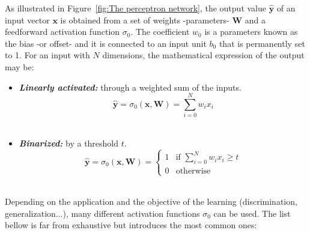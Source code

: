 \documentclass[a4paper,11pt]{report}
\newcommand{\Important}[1]{\textbf{{\em #1}}}
\begin{document}
		As illustrated in Figure~\ref{fig:The perceptron network}, the output value $\mathbf{\hat{y}}$ of an input vector $\mathbf{x}$ is obtained from a set of weights -parameters- $\mathbf{W}$ and a feedforward activation function $\sigma_{0}$. The coefficient $w_{0}$ is a parameters known as the bias -or offset- and it is connected to an input unit $b_{0}$ that is permanently set to 1. For an input with $N$ dimensions, the mathematical expression of the output may be:\\
		
    \begin{itemize}
      \item \Important{Linearly activated:} through a weighted sum of the inputs.
      \begin{equation}
        \mathbf{\hat{y}} = \sigma_{0}(\mathbf{x},\mathbf{W}) = \sum_{i=0}^{N} w_{i} x_{i}        
      \end{equation}\\
			
			\item \Important{Binarized:} by a threshold $t$.
			\begin{equation}
				\mathbf{\hat{y}} = \sigma_{0}(\mathbf{x},\mathbf{W}) = 
				\begin{cases}
					1 & \text{if } \sum_{i=0}^{N} w_{i} x_{i} \geq t \\
					0 & \text{otherwise}
				\end{cases}
			\end{equation}\\
		\end{itemize}     
     
			Depending on the application and the objective of the learning (discrimination, generalization...), many different activation functions $\sigma_{0}$ can be used. The list bellow is far from exhaustive but introduces the most common ones:\\
			
\end{document}
